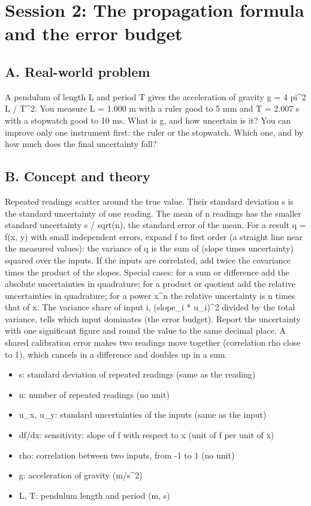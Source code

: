 \documentclass[11pt,a4paper]{article}
\begin{document}
\section{Session 2: The propagation formula and the error budget}

\subsection*{A. Real-world problem}
A pendulum of length L and period T gives the acceleration of gravity g = 4 pi\textasciicircum{}2 L / T\textasciicircum{}2. You measure L = 1.000 m with a ruler good to 5 mm and T = 2.007 s with a stopwatch good to 10 ms. What is g, and how uncertain is it? You can improve only one instrument first: the ruler or the stopwatch. Which one, and by how much does the final uncertainty fall?

\subsection*{B. Concept and theory}
Repeated readings scatter around the true value. Their standard deviation s is the standard uncertainty of one reading. The mean of n readings has the smaller standard uncertainty s / sqrt(n), the standard error of the mean. For a result q = f(x, y) with small independent errors, expand f to first order (a straight line near the measured values): the variance of q is the sum of (slope times uncertainty) squared over the inputs. If the inputs are correlated, add twice the covariance times the product of the slopes. Special cases: for a sum or difference add the absolute uncertainties in quadrature; for a product or quotient add the relative uncertainties in quadrature; for a power x\textasciicircum{}n the relative uncertainty is n times that of x. The variance share of input i, (slope\_i * u\_i)\textasciicircum{}2 divided by the total variance, tells which input dominates (the error budget). Report the uncertainty with one significant figure and round the value to the same decimal place. A shared calibration error makes two readings move together (correlation rho close to 1), which cancels in a difference and doubles up in a sum.

\begin{itemize}[nosep]
\item s: standard deviation of repeated readings (same as the reading)
\item n: number of repeated readings (no unit)
\item u\_x, u\_y: standard uncertainties of the inputs (same as the input)
\item df/dx: sensitivity: slope of f with respect to x (unit of f per unit of x)
\item rho: correlation between two inputs, from -1 to 1 (no unit)
\item g: acceleration of gravity (m/s\textasciicircum{}2)
\item L, T: pendulum length and period (m, s)
\end{itemize}
\end{document}
